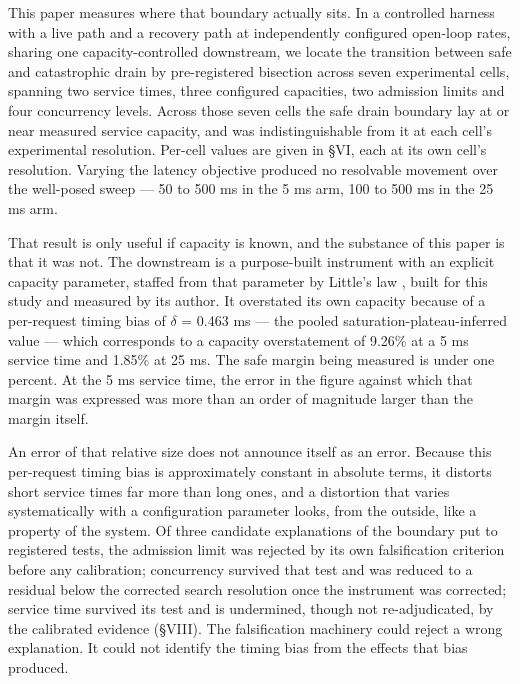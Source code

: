 \documentclass{ieeeaccess}
\begin{document}
This paper measures where that boundary actually sits. In a controlled harness with a live path and a recovery path at independently configured open-loop rates, sharing one capacity-controlled downstream, we locate the transition between safe and catastrophic drain by pre-registered bisection across seven experimental cells, spanning two service times, three configured capacities, two admission limits and four concurrency levels. Across those seven cells the safe drain boundary lay at or near measured service capacity, and was indistinguishable from it at each cell's experimental resolution. Per-cell values are given in \S{}VI, each at its own cell's resolution. Varying the latency objective produced no resolvable movement over the well-posed sweep --- 50 to 500 ms in the 5 ms arm, 100 to 500 ms in the 25 ms arm.

That result is only useful if capacity is known, and the substance of this paper is that it was not. The downstream is a purpose-built instrument with an explicit capacity parameter, staffed from that parameter by Little's law \cite{little}, built for this study and measured by its author. It overstated its own capacity because of a per-request timing bias of $\delta$ = 0.463 ms --- the pooled saturation-plateau-inferred value --- which corresponds to a capacity overstatement of 9.26\% at a 5 ms service time and 1.85\% at 25 ms. The safe margin being measured is under one percent. At the 5 ms service time, the error in the figure against which that margin was expressed was more than an order of magnitude larger than the margin itself.

An error of that relative size does not announce itself as an error. Because this per-request timing bias is approximately constant in absolute terms, it distorts short service times far more than long ones, and a distortion that varies systematically with a configuration parameter looks, from the outside, like a property of the system. Of three candidate explanations of the boundary put to registered tests, the admission limit was rejected by its own falsification criterion before any calibration; concurrency survived that test and was reduced to a residual below the corrected search resolution once the instrument was corrected; service time survived its test and is undermined, though not re-adjudicated, by the calibrated evidence (\S{}VIII). The falsification machinery could reject a wrong explanation. It could not identify the timing bias from the effects that bias produced.
\end{document}
